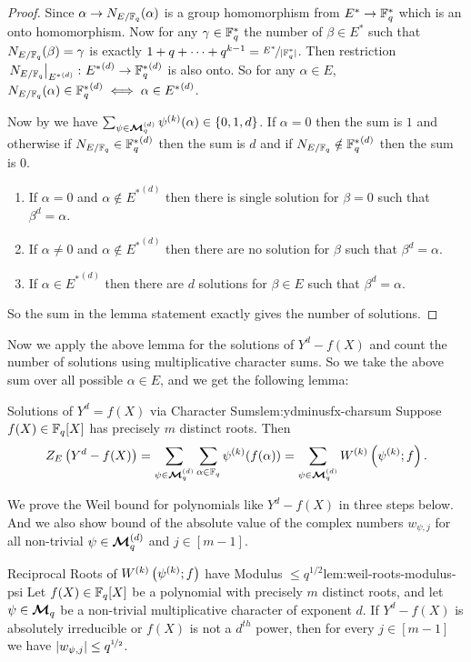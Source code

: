 \begin{proof}
  Since $\alpha\to N_{E/\mathbb{F}_q}(\alpha)$ is a group homomorphism from $ E^*\to\mathbb{F}_q^*$ which is an onto homomorphism. Now for any $\gamma\in\mathbb{F}_q^*$ the number of $\beta\in E^*$ such that $N_{E/\mathbb{F}_q}(\beta)=\gamma$ is exactly $1+q+\cdots +q^{k-1}=\nicefrac{ E^*}{|\mathbb{F}_q^*|}$. Then restriction $\left.N_{E/\mathbb{F}_q}\right|_{{ E^*}^{(d)}}\colon { E^*}^{(d)}\to {\mathbb{F}_q^*}^{(d)}$ is also onto. So for any $\alpha\in E$, $N_{E/\mathbb{F}_q}(\alpha)\in {\mathbb{F}_q^*}^{(d)}\iff \alpha\in{ E^*}^{(d)}$. 
  
  Now by  we have $\sum_{\psi\in\boldsymbol{\mathcal{M}}_q^{(d)}}\psi^{(k)}(\alpha)\in \{0,1,d\}$. If $\alpha=0$ then the sum is $1$ and otherwise if $N_{E/\mathbb{F}_q}\in {\mathbb{F}_q^*}^{(d)}$ then the sum is $d$ and if $N_{E/\mathbb{F}_q}\notin {\mathbb{F}_q^*}^{(d)}$ then the sum is $0$. 
  \begin{enumerate}[label=(\roman*),itemsep=-1mm]
    \item If $\alpha= 0$ and $\alpha\notin { E^*}^{(d)}$ then there is single solution for $\beta=0$ such that $\beta^d=\alpha$. 
    \item If $\alpha\neq 0$ and $\alpha\notin { E^*}^{(d)}$ then there are no solution for $\beta$ such that $\beta^d=\alpha$. 
    \item If $\alpha\in { E^*}^{(d)}$ then there are $d$ solutions for $\beta\in E$ such that $\beta^d=\alpha$.
  \end{enumerate}
  So the sum in the lemma statement exactly gives the number of solutions. 
\end{proof}
Now we apply the above lemma for the solutions of  $Y^d-f(X)$ and count the number of solutions using multiplicative character sums. So we take the above sum over all possible $\alpha\in E$, and we get the following lemma:
\begin{lemma}{Solutions of $Y^d=f(X)$ via Character Sums}{lem:ydminusfx-charsum}
  Suppose $f(X)\in\mathbb{F}_q[X]$ has precisely $m$ distinct roots. Then $$Z_E\left(Y^d-f(X)\right)=\sum_{\psi\in\boldsymbol{\mathcal{M}}_q^{(d)}}\sum_{\alpha\in\mathbb{F}_q}\psi^{(k)}(f(\alpha))=\sum_{\psi\in\boldsymbol{\mathcal{M}}_q^{(d)}}W^{(k)}\left(\psi^{(k)};f\right).$$
\end{lemma}
We prove the Weil bound for polynomials like $Y^d-f(X)$ in three steps below. And we also show bound of the absolute value of the complex numbers $w_{\psi,j}$  for all non-trivial $\psi\in\boldsymbol{\mathcal{M}}_q^{(d)}$ and $j\in[m-1]$. 
\begin{lemma}{Reciprocal Roots of $W^{(k)}\left(\psi^{(k)};f\right)$ have Modulus $\leq q^{1/2}$}{lem:weil-roots-modulus-psi}
  Let $f(X)\in\mathbb{F}_q[X]$ be a polynomial with precisely $m$ distinct roots, and let $\psi\in\boldsymbol{\mathcal{M}}_q$ be a non-trivial multiplicative character of exponent $d$. If $Y^d-f(X)$ is absolutely irreducible or $f(X)$ is not a $d^{th}$ power, then for every $j\in[m-1]$ we have $|w_{\psi,j}|\leq q^{\nicefrac12}$.
\end{lemma}
